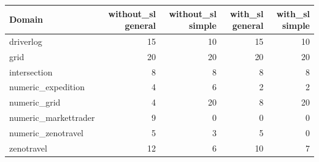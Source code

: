 \begin{tabular}{lrrrr}
\toprule
Domain & without\_sl general & without\_sl simple & with\_sl general & with\_sl simple \\
\midrule
driverlog & 15 & 10 & 15 & 10 \\
grid & 20 & 20 & 20 & 20 \\
intersection & 8 & 8 & 8 & 8 \\
numeric\_expedition & 4 & 6 & 2 & 2 \\
numeric\_grid & 4 & 20 & 8 & 20 \\
numeric\_markettrader & 9 & 0 & 0 & 0 \\
numeric\_zenotravel & 5 & 3 & 5 & 0 \\
zenotravel & 12 & 6 & 10 & 7 \\
\bottomrule
\end{tabular}
